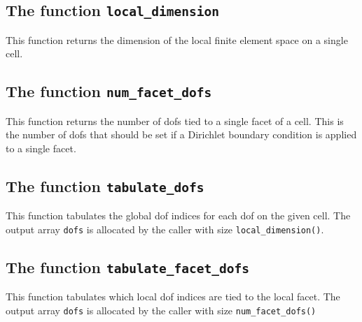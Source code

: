 \subsection{The function \texttt{local\_dimension}}
This function returns the dimension of the local finite element space on a single cell.


\subsection{The function \texttt{num\_facet\_dofs}}
This function returns the number of dofs tied to a single facet of a cell.
This is the number of dofs that should be set if a Dirichlet boundary condition is applied to a single facet.


\subsection{The function \texttt{tabulate\_dofs}}
This function tabulates the global dof indices for each dof on the given cell.
The output array \texttt{dofs} is allocated by the caller with size \texttt{local\_dimension()}.


\subsection{The function \texttt{tabulate\_facet\_dofs}}
This function tabulates which local dof indices are tied to the local facet.
The output array \texttt{dofs} is allocated by the caller with size \texttt{num\_facet\_dofs()}


